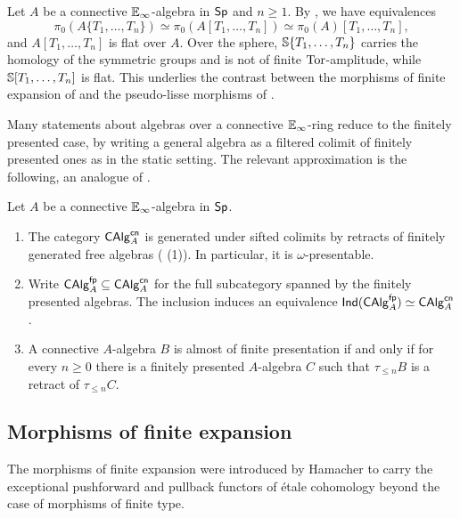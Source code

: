 \begin{remark}\label{rmk: free and flat algebras}
    Let $A$ be a connective $\mathbb{E}_{\infty}$-algebra in $\mathsf{Sp}$ and $n\geq 1$. By \cite[Rmk. 5.4.1.2 \& Not. B.1.1.2]{SAG}, we have equivalences
    $$\pi_{0}(A\{T_{1},\dots,T_{n}\})\simeq\pi_{0}(A[T_{1},\dots,T_{n}])\simeq\pi_{0}(A)[T_{1},\dots,T_{n}],$$
    and $A[T_{1},\dots,T_{n}]$ is flat over $A$. Over the sphere, $\mathbb{S}\{T_{1},\dots,T_{n}\}$ carries the homology of the symmetric groups and is not of finite $\mathrm{Tor}$-amplitude, while $\mathbb{S}[T_{1},\dots,T_{n}]$ is flat. This underlies the contrast between the morphisms of finite expansion of  and the pseudo-lisse morphisms of .
\end{remark}
Many statements about algebras over a connective $\mathbb{E}_{\infty}$-ring reduce to the finitely presented case, by writing a general algebra as a filtered colimit of finitely presented ones as in the static setting. The relevant approximation is the following, an analogue of \cite[\href{https://stacks.math.columbia.edu/tag/00QL}{Tag 00QL}]{stacks-project}.
\begin{proposition}[{\cite[Prop. 7.2.4.27]{HA}}]\label{prop: approximation by finitely presented algebras}
    Let $A$ be a connective $\mathbb{E}_{\infty}$-algebra in $\mathsf{Sp}$.
    \begin{enumerate}
        \item The category $\mathsf{CAlg}^{\mathsf{cn}}_{A}$ is generated under sifted colimits by retracts of finitely generated free algebras ( (1)). In particular, it is $\omega$-presentable.
        \item Write $\mathsf{CAlg}^{\mathsf{fp}}_{A}\subseteq\mathsf{CAlg}^{\mathsf{cn}}_{A}$ for the full subcategory spanned by the finitely presented algebras. The inclusion induces an equivalence $\mathsf{Ind}(\mathsf{CAlg}^{\mathsf{fp}}_{A})\simeq\mathsf{CAlg}^{\mathsf{cn}}_{A}$.
        \item A connective $A$-algebra $B$ is almost of finite presentation if and only if for every $n\geq 0$ there is a finitely presented $A$-algebra $C$ such that $\tau_{\leq n}B$ is a retract of $\tau_{\leq n}C$.
    \end{enumerate}
\end{proposition}
\subsection{Morphisms of finite expansion}\label{subsec: morphisms of finite expansion}
The morphisms of finite expansion were introduced by Hamacher \cite{FiniteExpansion} to carry the exceptional pushforward and pullback functors of \'{e}tale cohomology beyond the case of morphisms of finite type.

